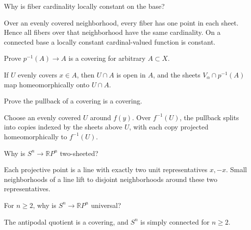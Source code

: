\begin{problem}\label{prob:viii10-06}
Why is fiber cardinality locally constant on the base?
\end{problem}
\begin{solution}
Over an evenly covered neighborhood, every fiber has one point in each sheet. Hence all fibers over that neighborhood have the same cardinality. On a connected base a locally constant cardinal-valued function is constant.
\end{solution}

\begin{problem}\label{prob:viii10-07}
Prove \(p^{-1}(A)\to A\) is a covering for arbitrary \(A\subset X\).
\end{problem}
\begin{solution}
If \(U\) evenly covers \(x\in A\), then \(U\cap A\) is open in \(A\), and the sheets \(V_\alpha\cap p^{-1}(A)\) map homeomorphically onto \(U\cap A\).
\end{solution}

\begin{problem}\label{prob:viii10-08}
Prove the pullback of a covering is a covering.
\end{problem}
\begin{solution}
Choose an evenly covered \(U\) around \(f(y)\). Over \(f^{-1}(U)\), the pullback splits into copies indexed by the sheets above \(U\), with each copy projected homeomorphically to \(f^{-1}(U)\).
\end{solution}

\begin{problem}\label{prob:viii10-09}
Why is \(S^n\to\mathbb RP^n\) two-sheeted?
\end{problem}
\begin{solution}
Each projective point is a line with exactly two unit representatives \(x,-x\). Small neighborhoods of a line lift to disjoint neighborhoods around these two representatives.
\end{solution}

\begin{problem}\label{prob:viii10-10}
For \(n\ge2\), why is \(S^n\to\mathbb RP^n\) universal?
\end{problem}
\begin{solution}
The antipodal quotient is a covering, and \(S^n\) is simply connected for \(n\ge2\).
\end{solution}

